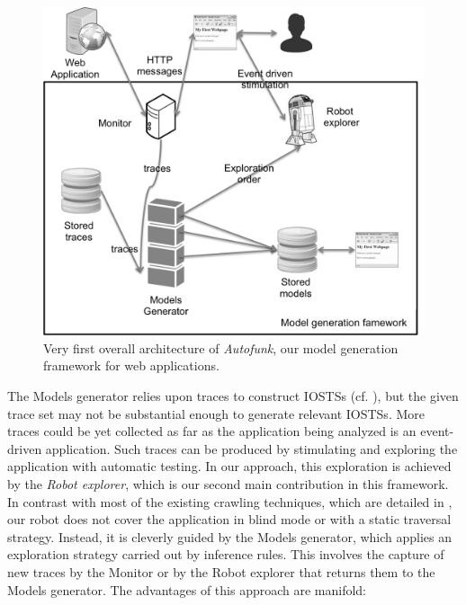 \begin{figure}[ht]
    \begin{center}
        \includegraphics[width=0.8\linewidth]{figures/soict-framework.png}
    \end{center}

    \caption{Very first overall architecture of \textit{Autofunk}, our
    model generation framework for web applications.}
    \label{fig:soict-framework}
\end{figure}

The Models generator relies upon traces to construct IOSTSs (cf.
), but the given
trace set may not be substantial enough to generate relevant
IOSTSs. More traces could be yet collected as far as the
application being analyzed is an event-driven application.  Such
traces can be produced by stimulating and exploring the
application with automatic testing. In our approach, this
exploration is achieved by the \textit{Robot explorer}, which is
our second main contribution in this framework. In contrast with
most of the existing crawling techniques, which are detailed in
, our robot does not
cover the application in blind mode or with a static traversal
strategy.  Instead, it is cleverly guided by the Models
generator, which applies an exploration strategy carried out by
inference rules.  This involves the capture of new traces by the
Monitor or by the Robot explorer that returns them to the Models
generator. The advantages of this approach are manifold:

